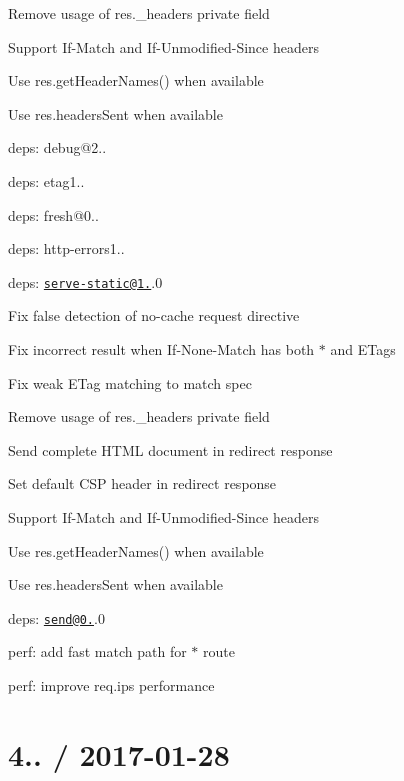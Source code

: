 \begin{DoxyItemize}
\begin{DoxyItemize}
\item Remove usage of {\ttfamily res.\+\_\+headers} private field
\item Support {\ttfamily If-\/\+Match} and {\ttfamily If-\/\+Unmodified-\/\+Since} headers
\item Use {\ttfamily res.\+get\+Header\+Names()} when available
\item Use {\ttfamily res.\+headers\+Sent} when available
\item deps\+: debug@2..
\item deps\+: etag1..
\item deps\+: fresh@0..
\item deps\+: http-\/errors1..
\end{DoxyItemize}
\item deps\+: \href{mailto:serve-static@1.12}{\tt serve-\/static@1.}.0
\begin{DoxyItemize}
\item Fix false detection of {\ttfamily no-\/cache} request directive
\item Fix incorrect result when {\ttfamily If-\/\+None-\/\+Match} has both {\ttfamily $\ast$} and E\+Tags
\item Fix weak {\ttfamily E\+Tag} matching to match spec
\item Remove usage of {\ttfamily res.\+\_\+headers} private field
\item Send complete H\+T\+ML document in redirect response
\item Set default C\+SP header in redirect response
\item Support {\ttfamily If-\/\+Match} and {\ttfamily If-\/\+Unmodified-\/\+Since} headers
\item Use {\ttfamily res.\+get\+Header\+Names()} when available
\item Use {\ttfamily res.\+headers\+Sent} when available
\item deps\+: \href{mailto:send@0.15}{\tt send@0.}.0
\end{DoxyItemize}
\item perf\+: add fast match path for {\ttfamily $\ast$} route
\item perf\+: improve {\ttfamily req.\+ips} performance
\end{DoxyItemize}

\section*{4.. / 2017-\/01-\/28 }


